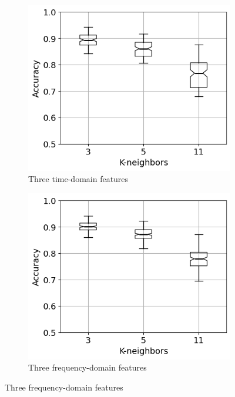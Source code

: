 \begin{figure}[h]
    \centering
    \begin{subfigure}[b]{0.48\textwidth}
        \includegraphics[width=\textwidth]{assets/results/feature-combinations/TD-3-A-True-False-F3.png}
        \caption{Three time-domain features}
    \end{subfigure}
    \hfill
    \begin{subfigure}[b]{0.48\textwidth}
        \includegraphics[width=\textwidth]{assets/results/feature-combinations/FD-3-A-True-False-F3.png}
        \caption{Three frequency-domain features}

\end{subfigure}
\end{figure}
